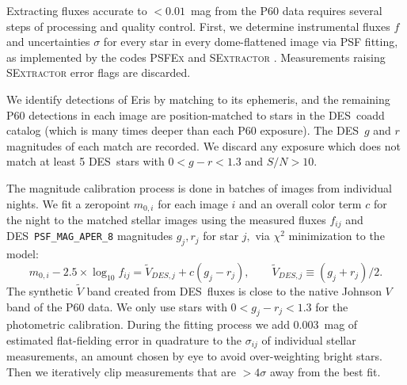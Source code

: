\documentclass[onecolumn]{aastex631}
\newcommand{\des}{DES}
\begin{document}
Extracting fluxes accurate to $<0.01$~mag from the P60 data requires several steps of processing and quality control. First, we determine instrumental  fluxes $f$ and uncertainties $\sigma$ for every star in every dome-flattened image via PSF fitting, as implemented by the codes \textsc{PSFEx} \citep{psfex} and \textsc{SExtractor} \citep{sextractor}. Measurements raising \textsc{SExtractor} error flags are discarded.

We identify detections of Eris by matching to its ephemeris, and the remaining P60 detections in each image are position-matched to stars in the \des\ coadd catalog (which is many times deeper than each P60 exposure).  The \des\ $g$ and $r$ magnitudes of each match are recorded. We discard any exposure which does not match at least 5 \des\ stars with $0<g-r<1.3$ and $S/N>10.$

The magnitude calibration process is done in batches of images from individual nights. We fit a zeropoint $m_{0,i}$ for each image $i$ and an overall color term $c$ for the night to the matched stellar images using the measured fluxes $f_{ij}$ and \des\ \texttt{PSF\_MAG\_APER\_8} magnitudes $g_j, r_j$ for star $j,$ via $\chi^2$ minimization to the model:
  \begin{equation}
    m_{0,i} - 2.5 \times \log_{10} f_{ij} = \tilde V_{DES,j} + c(g_j-r_j), \qquad \tilde V_{DES,j}\equiv (g_j+r_j)/2.
  \end{equation}
The synthetic $\tilde V$ band created from \des\ fluxes is close to the native Johnson $V$ band of the P60 data. We only use stars with $0<g_j-r_j<1.3$ for the photometric calibration.
During the fitting process we add 0.003~mag of estimated flat-fielding error in quadrature to the $\sigma_{ij}$ of individual stellar measurements, an amount chosen by eye to avoid over-weighting bright stars.  Then we iteratively clip measurements that are $>4\sigma$ away from the best fit.
\end{document}
